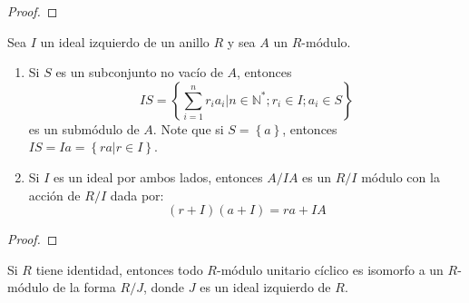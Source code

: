 \documentclass[12pt]{report}
\newcounter{it}
\theoremstyle{largebreak}
\begin{document}
    \begin{proof}
        
    \end{proof}

    \begin{excer}
        Sea $I$ un ideal izquierdo de un anillo $R$ y sea $A$ un $R$-módulo.
        \begin{enumerate}[label = \textit{(\alph*)}]
            \item Si $S$ es un subconjunto no vacío de $A$, entonces
            \begin{equation*}
                IS=\left\{\sum_{ i=1}^n r_ia_i\Big|n\in\mathbb{N}^*;r_i\in I;a_i\in S \right\}
            \end{equation*}
            es un submódulo de $A$. Note que si $S=\left\{a \right\}$, entonces $IS=Ia=\left\{ra\Big|r\in I \right\}$.
            \item Si $I$ es un ideal por ambos lados, entonces $A/IA$ es un $R/I$ módulo con la acción de $R/I$ dada por:
            \begin{equation*}
                (r+I)(a+I)=ra+IA
            \end{equation*}
        \end{enumerate}
    \end{excer}

    \begin{proof}
        
    \end{proof}

    \begin{excer}
        Si $R$ tiene identidad, entonces todo $R$-módulo unitario cíclico es isomorfo a un $R$-módulo de la forma $R/J$, donde $J$ es un ideal izquierdo de $R$.
    \end{excer}
\end{document}
